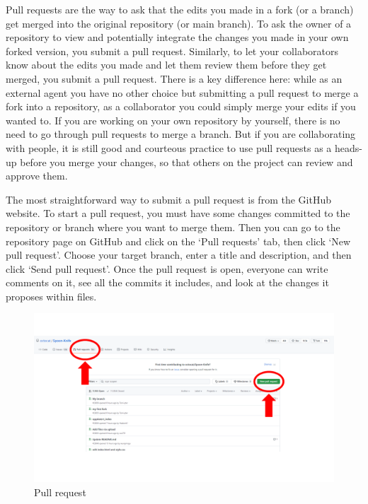 \documentclass[
]{book}
\begin{document}
Pull requests are the way to ask that the edits you made in a fork (or a branch) get merged into the original repository (or main branch). To ask the owner of a repository to view and potentially integrate the changes you made in your own forked version, you submit a pull request. Similarly, to let your collaborators know about the edits you made and let them review them before they get merged, you submit a pull request. There is a key difference here: while as an external agent you have no other choice but submitting a pull request to merge a fork into a repository, as a collaborator you could simply merge your edits if you wanted to. If you are working on your own repository by yourself, there is no need to go through pull requests to merge a branch. But if you are collaborating with people, it is still good and courteous practice to use pull requests as a heads-up before you merge your changes, so that others on the project can review and approve them.

The most straightforward way to submit a pull request is from the GitHub website. To start a pull request, you must have some changes committed to the repository or branch where you want to merge them. Then you can go to the repository page on GitHub and click on the `Pull requests' tab, then click `New pull request'. Choose your target branch, enter a title and description, and then click `Send pull request'. Once the pull request is open, everyone can write comments on it, see all the commits it includes, and look at the changes it proposes within files.

\begin{figure}

{\centering \includegraphics[width=1\linewidth]{img/github-04} 

}

\caption{Pull request}\label{fig:github04}
\end{figure}
\end{document}
